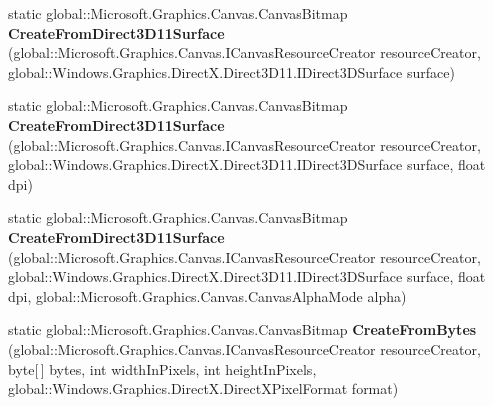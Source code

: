 \begin{DoxyCompactItemize}
\item 
\mbox{\label{class_microsoft_1_1_graphics_1_1_canvas_1_1_canvas_bitmap_adb53e7172552d09bc317b5b85c254fff}} 
static global\+::\+Microsoft.\+Graphics.\+Canvas.\+Canvas\+Bitmap {\bfseries Create\+From\+Direct3\+D11\+Surface} (global\+::\+Microsoft.\+Graphics.\+Canvas.\+I\+Canvas\+Resource\+Creator resource\+Creator, global\+::\+Windows.\+Graphics.\+Direct\+X.\+Direct3\+D11.\+I\+Direct3\+D\+Surface surface)
\item 
\mbox{\label{class_microsoft_1_1_graphics_1_1_canvas_1_1_canvas_bitmap_a9bcb0865c8ef9a544991db05907b06ff}} 
static global\+::\+Microsoft.\+Graphics.\+Canvas.\+Canvas\+Bitmap {\bfseries Create\+From\+Direct3\+D11\+Surface} (global\+::\+Microsoft.\+Graphics.\+Canvas.\+I\+Canvas\+Resource\+Creator resource\+Creator, global\+::\+Windows.\+Graphics.\+Direct\+X.\+Direct3\+D11.\+I\+Direct3\+D\+Surface surface, float dpi)
\item 
\mbox{\label{class_microsoft_1_1_graphics_1_1_canvas_1_1_canvas_bitmap_af8889f744c558157dc904b1fd37e99a4}} 
static global\+::\+Microsoft.\+Graphics.\+Canvas.\+Canvas\+Bitmap {\bfseries Create\+From\+Direct3\+D11\+Surface} (global\+::\+Microsoft.\+Graphics.\+Canvas.\+I\+Canvas\+Resource\+Creator resource\+Creator, global\+::\+Windows.\+Graphics.\+Direct\+X.\+Direct3\+D11.\+I\+Direct3\+D\+Surface surface, float dpi, global\+::\+Microsoft.\+Graphics.\+Canvas.\+Canvas\+Alpha\+Mode alpha)
\item 
\mbox{\label{class_microsoft_1_1_graphics_1_1_canvas_1_1_canvas_bitmap_a0348f1385bf9b0fc99f3bd0a55c0ae0a}} 
static global\+::\+Microsoft.\+Graphics.\+Canvas.\+Canvas\+Bitmap {\bfseries Create\+From\+Bytes} (global\+::\+Microsoft.\+Graphics.\+Canvas.\+I\+Canvas\+Resource\+Creator resource\+Creator, byte\mbox{[}$\,$\mbox{]} bytes, int width\+In\+Pixels, int height\+In\+Pixels, global\+::\+Windows.\+Graphics.\+Direct\+X.\+Direct\+X\+Pixel\+Format format)
\item 
\mbox{\label{class_microsoft_1_1_graphics_1_1_canvas_1_1_canvas_bitmap_a34eb9feffadf35700e66c251dd67d5fc}} 

\end{DoxyCompactItemize}

